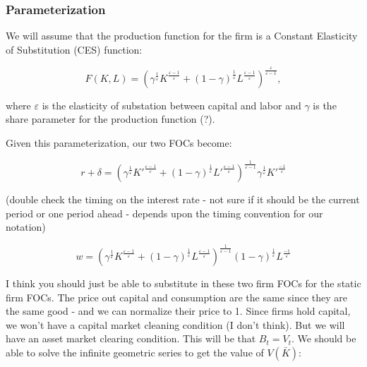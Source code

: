 \documentclass[letterpaper,12pt]{article}
\theoremstyle{definition}
\begin{document}
\begin{spacing}{1.5}
      \subsubsection{Parameterization}

      We will assume that the production function for the firm is a Constant Elasticity of Substitution (CES) function:

      \begin{equation}
      \label{eqn:prod_func}
      F(K,L) = \left(\gamma^{\frac{1}{\varepsilon}}K^{\frac{\varepsilon-1}{\varepsilon}} + (1-\gamma)^{\frac{1}{\varepsilon}}L^{\frac{\varepsilon-1}{\varepsilon}}\right)^{\frac{\varepsilon}{\varepsilon-1}},
      \end{equation}

      \noindent\noindent where $\varepsilon$ is the elasticity of substation between capital and labor and $\gamma$ is the share parameter for the production function (?).  

      Given this parameterization, our two FOCs become:

      \begin{equation}
      \label{eqn:foc_k3}
       r+\delta =\left(\gamma^{\frac{1}{\varepsilon}}K'^{\frac{\varepsilon-1}{\varepsilon}} + (1-\gamma)^{\frac{1}{\varepsilon}}L'^{\frac{\varepsilon-1}{\varepsilon}}\right)^{\frac{1}{\varepsilon-1}}\gamma^{\frac{1}{\varepsilon}}K'^{\frac{-1}{\varepsilon}}
      \end{equation}

      (double check the timing on the interest rate - not sure if it should be the current period or one period ahead - depends upon the timing convention for our notation)

      \begin{equation}
      \label{eqn:foc_l2}
      w= \left(\gamma^{\frac{1}{\varepsilon}}K^{\frac{\varepsilon-1}{\varepsilon}} + (1-\gamma)^{\frac{1}{\varepsilon}}L^{\frac{\varepsilon-1}{\varepsilon}}\right)^{\frac{1}{\varepsilon-1}}(1-\gamma)^{\frac{1}{\varepsilon}}L^{\frac{-1}{\varepsilon}}
      \end{equation}

      I think you should just be able to substitute in these two firm FOCs for the static firm FOCs.  The price out capital and consumption are the same since they are the same good - and we can normalize their price to 1.  Since firms hold capital, we won't have a capital market cleaning condition (I don't think).  But we will have an asset market clearing condition.  This will be that $B_{t}=V_{t}$.  We should be able to solve the infinite geometric series to get the value of $V(\bar{K})$:


\end{spacing}
\end{document}
